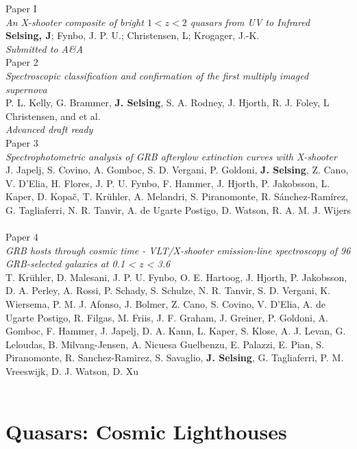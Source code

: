 {\large Paper I} \\
\textit{An X-shooter composite of bright $1<z<2$ quasars from UV to Infrared} \\
\textbf{Selsing, J}; Fynbo, J. P. U.; Christensen, L;  Krogager, J.-K. \\
\textit{Submitted to A\&A} \\

{\large Paper 2} \\
\textit{Spectroscopic classification and confirmation of the first multiply imaged supernova}\\
P. L. Kelly, G. Brammer, \textbf{J. Selsing}, S. A. Rodney, J. Hjorth, R. J. Foley, L Christensen, and et al. \\
\textit{Advanced draft ready} \\


{\large Paper 3} \\
\textit{Spectrophotometric analysis of GRB afterglow extinction curves with X-shooter} \\
J. Japelj, S. Covino, A. Gomboc, S. D. Vergani, P. Goldoni,\textbf{ J. Selsing}, Z. Cano, V. D'Elia, H. Flores, J. P. U. Fynbo, F. Hammer, J. Hjorth, P. Jakobsson, L. Kaper, D. Kopač, T. Krühler, A. Melandri, S. Piranomonte, R. Sánchez-Ramírez, G. Tagliaferri, N. R. Tanvir, A. de Ugarte Postigo, D. Watson, R. A. M. J. Wijers \\
\citet{Japelj2015} \\

{\large Paper 4} \\
\textit{GRB hosts through cosmic time - VLT/X-shooter emission-line spectroscopy of 96 GRB-selected galaxies at 0.1 < z < 3.6} \\
T. Krühler, D. Malesani, J. P. U. Fynbo, O. E. Hartoog, J. Hjorth, P. Jakobsson, D. A. Perley, A. Rossi, P. Schady, S. Schulze, N. R. Tanvir, S. D. Vergani, K. Wiersema, P. M. J. Afonso, J. Bolmer, Z. Cano, S. Covino, V. D'Elia, A. de Ugarte Postigo, R. Filgas, M. Friis, J. F. Graham, J. Greiner, P. Goldoni, A. Gomboc, F. Hammer, J. Japelj, D. A. Kann, L. Kaper, S. Klose, A. J. Levan, G. Leloudas, B. Milvang-Jensen, A. Nicuesa Guelbenzu, E. Palazzi, E. Pian, S. Piranomonte, R. Sanchez-Ramirez, S. Savaglio, \textbf{J. Selsing}, G. Tagliaferri, P. M. Vreeswijk, D. J. Watson, D. Xu \\
\citet{Kruhler2015} \\


\clearpage

\section{Quasars: Cosmic Lighthouses}
\label{sec:intro:qso}

